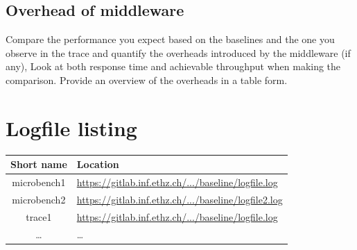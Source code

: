 \documentclass[11pt]{article}
\begin{document}
\subsection{Overhead of middleware}

Compare the performance you expect based on the baselines and the one you observe in the trace and quantify the overheads introduced by the middleware (if any), Look at both response time and achievable throughput when making the comparison. Provide an overview of the overheads in a table form.


\pagebreak

\section*{Logfile listing}

\begin{tabular}{|c|l|}
\hline \textbf{Short name }& \textbf{Location} \\ 
\hline microbench1 & \url{https://gitlab.inf.ethz.ch/.../baseline/logfile.log} \\ 
\hline microbench2 & \url{https://gitlab.inf.ethz.ch/.../baseline/logfile2.log} \\ 
\hline trace1 & \url{https://gitlab.inf.ethz.ch/.../baseline/logfile.log} \\ 
\hline \dots & \dots \\ 
\hline 
\end{tabular} 
\end{document}
